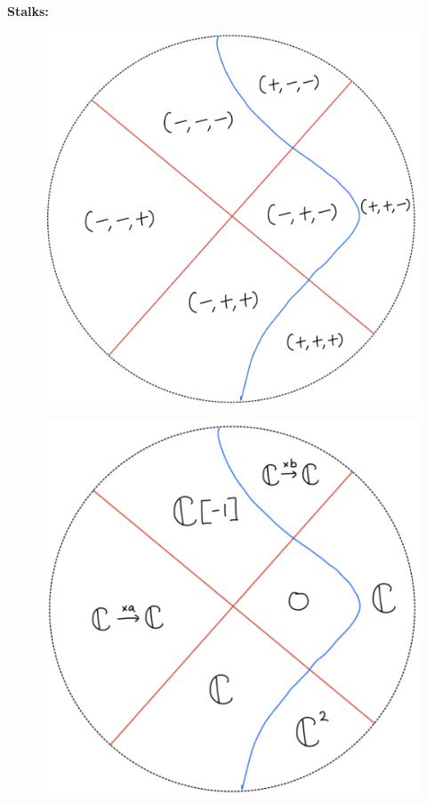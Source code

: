 \textbf{Stalks:}
\begin{figure}[H]
    \centering
    \includegraphics[scale = 0.95]{diagrams/lemma4/22.png}
    \caption{}
    \label{fig:your-label}
\end{figure}
\begin{figure}[H]
    \centering
    \includegraphics[scale = 0.95]{diagrams/lemma4/23.png}
    \caption{}
    \label{fig:your-label}
\end{figure}
